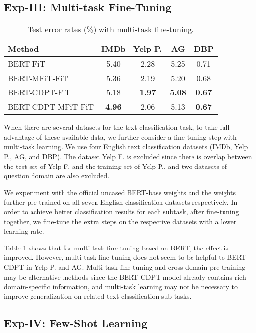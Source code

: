 \documentclass[11pt,a4paper]{article}
\theoremstyle{definition}
\begin{document}
\begin{CJK*}{UTF8}{gbsn}
\subsection{Exp-III: Multi-task Fine-Tuning} \label{sec:exp-mtl}


\begin{table}[h!]\small\setlength{\tabcolsep}{5pt}
	\centering
	\begin{tabular}{l c c c c}
		\toprule
		Method & IMDb & Yelp P. & AG & DBP \\
		\midrule
		BERT-FiT & 5.40 & 2.28 & 5.25 & 0.71 \\
BERT-MFiT-FiT & 5.36 & 2.19 & 5.20 & 0.68 \\
		\midrule
		BERT-CDPT-FiT & 5.18 & \textbf{1.97} & \textbf{5.08} & \textbf{0.67} \\
BERT-CDPT-MFiT-FiT & \textbf{4.96} & 2.06 & 5.13 & \textbf{0.67} \\
		\bottomrule
	\end{tabular}
	\caption{\label{tb:multitask}Test error rates (\%) with multi-task fine-tuning.
	}
\end{table}

When there are several datasets for the text classification task, to take full advantage of these available data, we further consider a fine-tuning step with multi-task learning. We use four English text classification datasets (IMDb, Yelp P., AG, and DBP). The dataset Yelp F. is excluded since there is overlap between the test set of Yelp F. and the training set of Yelp P., and two datasets of question domain are also excluded.

We experiment with the official uncased BERT-base weights and the weights further pre-trained on all seven English classification datasets respectively. In order to achieve better classification results for each subtask, after fine-tuning together, we fine-tune the extra steps on the respective datasets with a lower learning rate.

Table \ref{tb:multitask} shows that for multi-task fine-tuning based on BERT, the effect is improved. However, multi-task fine-tuning does not seem to be helpful to BERT-CDPT in Yelp P. and AG. Multi-task fine-tuning and cross-domain pre-training may be alternative methods since the BERT-CDPT model already contains rich domain-specific information, and multi-task learning may not be necessary to improve generalization on related text classification sub-tasks.




\subsection{Exp-IV: Few-Shot Learning}\label{sec:exp-few}


\end{CJK*}
\end{document}
